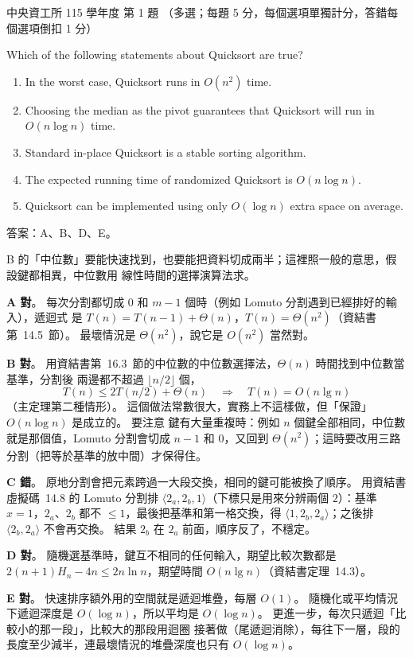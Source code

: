 \begin{pastexam}[label={px:ncu-115-dsa-01}]{中央資工所 115 學年度 第 1 題}
（多選；每題 5 分，每個選項單獨計分，答錯每個選項倒扣 1 分）

Which of the following statements about Quicksort are true?
\begin{enumerate}[label=\Alph*.]
\item In the worst case, Quicksort runs in $O(n^2)$ time.
\item Choosing the median as the pivot guarantees that Quicksort will run in $O(n\log n)$ time.
\item Standard in-place Quicksort is a stable sorting algorithm.
\item The expected running time of randomized Quicksort is $O(n\log n)$.
\item Quicksort can be implemented using only $O(\log n)$ extra space on average.
\end{enumerate}
\end{pastexam}

\begin{pastsoln}
答案：A、B、D、E。

B 的「中位數」要能快速找到，也要能把資料切成兩半；這裡照一般的意思，假設鍵都相異，中位數用
線性時間的選擇演算法求。

\textbf{A 對}。 每次分割都切成 $0$ 和 $m - 1$ 個時（例如 Lomuto 分割遇到已經排好的輸入），遞迴式
是 $T(n) = T(n - 1) + \Theta(n)$，$T(n) = \Theta(n^2)$（資結書第~14.5~節）。 最壞情況是
$\Theta(n^2)$，說它是 $O(n^2)$ 當然對。

\textbf{B 對}。 用資結書第~16.3~節的中位數的中位數選擇法，$\Theta(n)$ 時間找到中位數當基準，分割後
兩邊都不超過 $\lfloor n/2 \rfloor$ 個，
\[
T(n) \le 2T(n/2) + \Theta(n) \quad\Longrightarrow\quad T(n) = O(n \lg n)
\]
（主定理第二種情形）。 這個做法常數很大，實務上不這樣做，但「保證」$O(n \log n)$ 是成立的。 要注意
鍵有大量重複時：例如 $n$ 個鍵全部相同，中位數就是那個值，Lomuto 分割會切成 $n - 1$ 和 $0$，又回到
$\Theta(n^2)$；這時要改用三路分割（把等於基準的放中間）才保得住。

\textbf{C 錯}。 原地分割會把元素跨過一大段交換，相同的鍵可能被換了順序。 用資結書虛擬碼~14.8 的
Lomuto 分割排 $\langle 2_a, 2_b, 1\rangle$（下標只是用來分辨兩個 $2$）：基準 $x = 1$，$2_a$、$2_b$
都不 $\le 1$，最後把基準和第一格交換，得 $\langle 1, 2_b, 2_a\rangle$；之後排 $\langle 2_b, 2_a\rangle$
不會再交換。 結果 $2_b$ 在 $2_a$ 前面，順序反了，不穩定。

\textbf{D 對}。 隨機選基準時，鍵互不相同的任何輸入，期望比較次數都是
$2(n+1)H_n - 4n \le 2n \ln n$，期望時間 $O(n \lg n)$（資結書定理~14.3）。

\textbf{E 對}。 快速排序額外用的空間就是遞迴堆疊，每層 $O(1)$。 隨機化或平均情況下遞迴深度是
$O(\log n)$，所以平均是 $O(\log n)$。 更進一步，每次只遞迴「比較小的那一段」，比較大的那段用迴圈
接著做（尾遞迴消除），每往下一層，段的長度至少減半，連最壞情況的堆疊深度也只有 $O(\log n)$。
\end{pastsoln}
